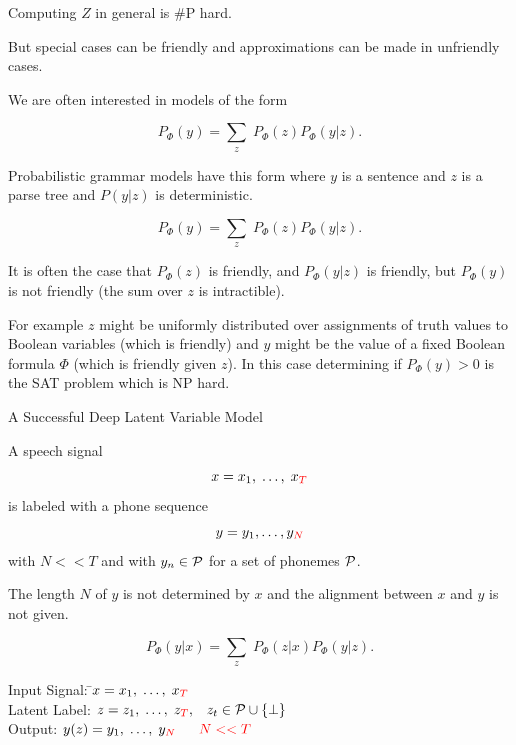 {\vfill
Computing $Z$ in general is \#P hard.

\vfill
{\color{red} But special cases can be friendly and approximations can be made in unfriendly cases.}


We are often interested in models of the form

\vfill
{\color{red} $$P_\Phi(y) = \sum_z\;P_\Phi(z)P_\Phi(y|z).$$}

\vfill
Probabilistic grammar models have this form where $y$ is a sentence and $z$ is a parse tree
and $P(y|z)$ is deterministic.


{\color{red} $$P_\Phi(y) = \sum_z\;P_\Phi(z)P_\Phi(y|z).$$}

\vfill
It is often the case that $P_\Phi(z)$ is friendly, and $P_\Phi(y|z)$ is friendly, but $P_\Phi(y)$ is not friendly (the sum over $z$ is intractible).

\vfill
For example $z$ might be uniformly distributed over assignments of truth values to Boolean variables (which is friendly) and $y$ might be the value of a fixed Boolean formula $\Phi$ (which is friendly given $z$).  In this case
determining if $P_\Phi(y) > 0$ is the SAT problem which is NP hard.

{A Successful Deep Latent Variable Model}

A speech signal
$$x = x_1,\; \ldots,\; x_{\color{red} T}$$
is labeled with a phone sequence
$$y = y_1, \ldots, y_{\color{red} N}$$
with {\color{red} $N << T$} and with $y_n \in {\cal P}$ for a set of phonemes ${\cal P}$.

\vfill
{\color{red} The length $N$ of $y$ is not determined by $x$ and the alignment between $x$ and $y$ is not given.}


{\color{red} $$P_\Phi(y|x) = \sum_z\;P_\Phi(z|x)P_\Phi(y|z).$$}

\vfill
\begin{tabbing}
Input Signal: \hspace{3em} \=$x = x_1,\;\ldots,\;x_{\color{red} T}$ \\
Latent Label: \>$z = z_1,\;\ldots,\;z_{\color{red} T},\;\;\;z_t \in {\cal P} \cup \{\bot\}$ \\
Output: \>$y(z) = y_1,\;\ldots,\;y_{\color{red} N}\;\;\;\;\;\;{\color{red} N << T}$
\end{tabbing}

}
